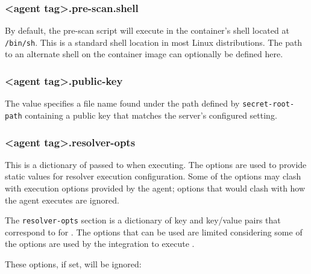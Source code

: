 \subsubsection{<agent tag>.pre-scan.shell}\label{sec:agent-pre-scan-shell}
By default, the pre-scan script will execute in the container's shell located at \texttt{/bin/sh}.  This is a standard shell location
in most Linux distributions.  The path to an alternate shell on the container image can optionally be defined here.

\subsubsection{<agent tag>.public-key}\label{sec:agent-public-key}
The value specifies a file name found under the path defined by \texttt{secret-root-path} containing a 
public key that matches the server's configured  setting.


\subsubsection{<agent tag>.resolver-opts}\label{sec:agent-resolver-opts}
This is a dictionary of
passed to \scaresolver when executing.  The options are used to provide static values for resolver execution configuration.  Some of the
options may clash with execution options provided by the agent; options that would clash with how the agent executes \scaresolver are ignored.  

The \texttt{resolver-opts} section is a dictionary of key and key/value pairs that correspond to
 for \scaresolver.
The options that can be used are limited considering some of the options are used by the \cxoneflow integration to execute \scaresolver.

These options, if set, will be ignored:

